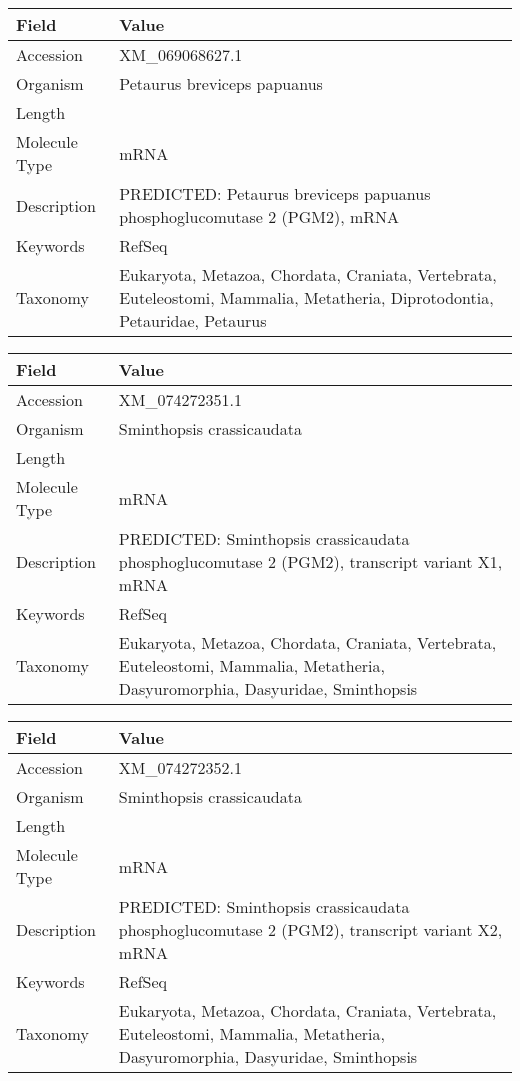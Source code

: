 \documentclass[10pt]{article}
\begin{document}
\vspace{1em}
{\footnotesize
\begin{longtable}{>{\raggedright\arraybackslash}p{4.5cm} >{\raggedright\arraybackslash}p{11.5cm}}
\textbf{Field} & \textbf{Value} \\
\hline
Accession & XM\_069068627.1 \\
Organism & Petaurus breviceps papuanus \\
Length & 3377 \\
Molecule Type & mRNA \\
Description & PREDICTED: Petaurus breviceps papuanus phosphoglucomutase 2 (PGM2), mRNA \\
Keywords & RefSeq \\
Taxonomy & Eukaryota, Metazoa, Chordata, Craniata, Vertebrata, Euteleostomi, Mammalia, Metatheria, Diprotodontia, Petauridae, Petaurus \\
\end{longtable}
}

\vspace{1em}
{\footnotesize
\begin{longtable}{>{\raggedright\arraybackslash}p{4.5cm} >{\raggedright\arraybackslash}p{11.5cm}}
\textbf{Field} & \textbf{Value} \\
\hline
Accession & XM\_074272351.1 \\
Organism & Sminthopsis crassicaudata \\
Length & 2785 \\
Molecule Type & mRNA \\
Description & PREDICTED: Sminthopsis crassicaudata phosphoglucomutase 2 (PGM2), transcript variant X1, mRNA \\
Keywords & RefSeq \\
Taxonomy & Eukaryota, Metazoa, Chordata, Craniata, Vertebrata, Euteleostomi, Mammalia, Metatheria, Dasyuromorphia, Dasyuridae, Sminthopsis \\
\end{longtable}
}

\vspace{1em}
{\footnotesize
\begin{longtable}{>{\raggedright\arraybackslash}p{4.5cm} >{\raggedright\arraybackslash}p{11.5cm}}
\textbf{Field} & \textbf{Value} \\
\hline
Accession & XM\_074272352.1 \\
Organism & Sminthopsis crassicaudata \\
Length & 2591 \\
Molecule Type & mRNA \\
Description & PREDICTED: Sminthopsis crassicaudata phosphoglucomutase 2 (PGM2), transcript variant X2, mRNA \\
Keywords & RefSeq \\
Taxonomy & Eukaryota, Metazoa, Chordata, Craniata, Vertebrata, Euteleostomi, Mammalia, Metatheria, Dasyuromorphia, Dasyuridae, Sminthopsis \\
\end{longtable}
}
\end{document}
